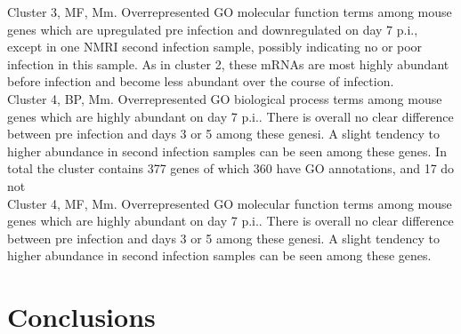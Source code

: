\documentclass{article}
\begin{document}
  Cluster 3, MF, Mm.
  Overrepresented GO molecular function terms among mouse genes which are upregulated pre infection and
  downregulated on day 7 p.i., except in one NMRI second infection sample, possibly indicating no or
  poor infection in this sample. As in cluster 2, these mRNAs are most highly abundant before infection and
  become less abundant over the course of infection.\\
  
  
  Cluster 4, BP, Mm.
  Overrepresented GO biological process terms among mouse genes which are highly abundant on day 7 p.i.. 
  There is overall no clear difference between pre infection and days 3 or 5 among these genesi. A slight
  tendency to higher abundance in second infection samples can be seen among these genes.
  In total the cluster contains 377 genes of which 360 have GO annotations, and 17 do not\\
  
  
  Cluster 4, MF, Mm.
  Overrepresented GO molecular function terms among mouse genes which are highly abundant on day 7 p.i.. 
  There is overall no clear difference between pre infection and days 3 or 5 among these genesi. A slight
  tendency to higher abundance in second infection samples can be seen among these genes.\\
  


\section{Conclusions}
\end{document}
